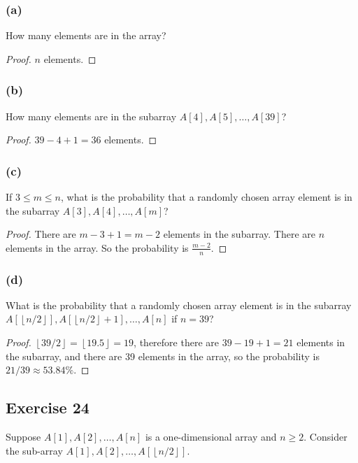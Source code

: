 \documentclass[14pt]{extarticle}
\newcommand{\floor}[1]{{\left\lfloor#1\right\rfloor}}
\begin{document}
\subsubsection{(a)}
How many elements are in the array?

\begin{proof}
     $n$ elements.
\end{proof}

\subsubsection{(b)}
How many elements are in the subarray \(A[4], A[5], \ldots, A[39]\)?

\begin{proof}
     \(39 - 4 + 1 = 36\) elements.
\end{proof}

\subsubsection{(c)}
If \(3 \leq m \leq n\), what is the probability that a randomly chosen array element is in the subarray
\(A[3], A[4], \ldots, A[m]\)?

\begin{proof}
     There are \(m - 3 + 1 = m-2\) elements in the subarray. There are $n$ elements in the array. So the probability is
     \(\frac{m-2}{n}\).
\end{proof}

\subsubsection{(d)}
What is the probability that a randomly chosen array element is in the subarray \\
\(A[\floor{n/2}], A[\floor{n/2}+1], \ldots, A[n]\) if \(n = 39\)?

\begin{proof}
     \(\floor{39/2} = \floor{19.5} = 19\), therefore there are \(39 - 19 + 1 = 21\) elements in the subarray, and there
     are 39 elements in the array, so the probability is \(21/39 \approx 53.84\%\).
\end{proof}

\subsection{Exercise 24}
Suppose \(A[1], A[2], \ldots, A[n]\) is a one-dimensional array and \(n \geq 2\). Consider the sub-array
\(A[1], A[2], \ldots, A[\floor{n/2}]\).
\end{document}
